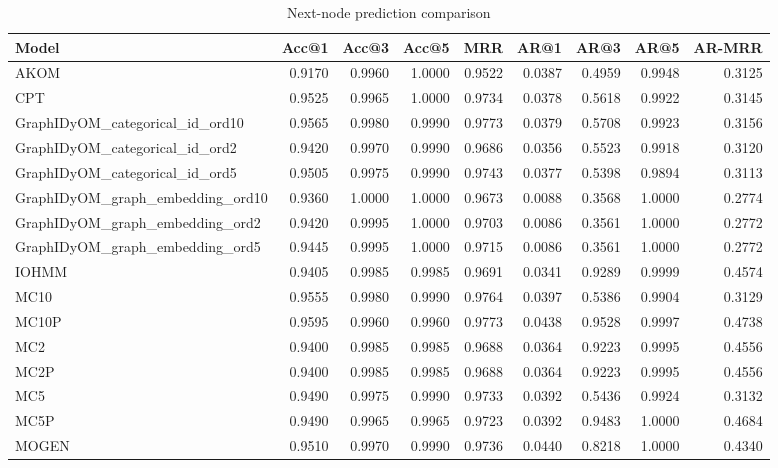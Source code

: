 \begin{table}
\caption{Next-node prediction comparison}
\label{tab:comparison}
\begin{tabular}{lrrrrrrrr}
\toprule
Model & Acc@1 & Acc@3 & Acc@5 & MRR & AR@1 & AR@3 & AR@5 & AR-MRR \\
\midrule
AKOM & 0.9170 & 0.9960 & 1.0000 & 0.9522 & 0.0387 & 0.4959 & 0.9948 & 0.3125 \\
CPT & 0.9525 & 0.9965 & 1.0000 & 0.9734 & 0.0378 & 0.5618 & 0.9922 & 0.3145 \\
GraphIDyOM_categorical_id_ord10 & 0.9565 & 0.9980 & 0.9990 & 0.9773 & 0.0379 & 0.5708 & 0.9923 & 0.3156 \\
GraphIDyOM_categorical_id_ord2 & 0.9420 & 0.9970 & 0.9990 & 0.9686 & 0.0356 & 0.5523 & 0.9918 & 0.3120 \\
GraphIDyOM_categorical_id_ord5 & 0.9505 & 0.9975 & 0.9990 & 0.9743 & 0.0377 & 0.5398 & 0.9894 & 0.3113 \\
GraphIDyOM_graph_embedding_ord10 & 0.9360 & 1.0000 & 1.0000 & 0.9673 & 0.0088 & 0.3568 & 1.0000 & 0.2774 \\
GraphIDyOM_graph_embedding_ord2 & 0.9420 & 0.9995 & 1.0000 & 0.9703 & 0.0086 & 0.3561 & 1.0000 & 0.2772 \\
GraphIDyOM_graph_embedding_ord5 & 0.9445 & 0.9995 & 1.0000 & 0.9715 & 0.0086 & 0.3561 & 1.0000 & 0.2772 \\
IOHMM & 0.9405 & 0.9985 & 0.9985 & 0.9691 & 0.0341 & 0.9289 & 0.9999 & 0.4574 \\
MC10 & 0.9555 & 0.9980 & 0.9990 & 0.9764 & 0.0397 & 0.5386 & 0.9904 & 0.3129 \\
MC10P & 0.9595 & 0.9960 & 0.9960 & 0.9773 & 0.0438 & 0.9528 & 0.9997 & 0.4738 \\
MC2 & 0.9400 & 0.9985 & 0.9985 & 0.9688 & 0.0364 & 0.9223 & 0.9995 & 0.4556 \\
MC2P & 0.9400 & 0.9985 & 0.9985 & 0.9688 & 0.0364 & 0.9223 & 0.9995 & 0.4556 \\
MC5 & 0.9490 & 0.9975 & 0.9990 & 0.9733 & 0.0392 & 0.5436 & 0.9924 & 0.3132 \\
MC5P & 0.9490 & 0.9965 & 0.9965 & 0.9723 & 0.0392 & 0.9483 & 1.0000 & 0.4684 \\
MOGEN & 0.9510 & 0.9970 & 0.9990 & 0.9736 & 0.0440 & 0.8218 & 1.0000 & 0.4340 \\
\bottomrule
\end{tabular}
\end{table}
